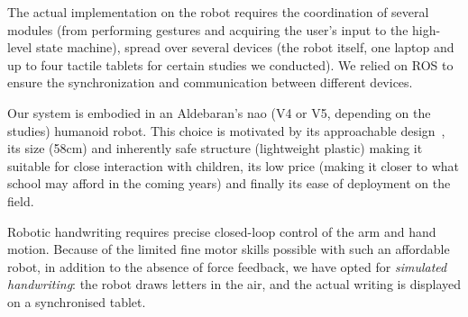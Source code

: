 \documentclass{sig-alternate}
\begin{document}
The actual implementation on the robot requires the coordination of
several modules (from performing gestures and acquiring the user's input to
the high-level state machine), spread over several devices (the robot itself,
one laptop and up to four tactile tablets for certain studies we conducted). We
relied on ROS to ensure the synchronization and communication between different devices.

Our system is embodied in an Aldebaran's {\sc nao} (V4 or V5, depending on the
studies) humanoid robot. This choice is motivated by its approachable
design~\cite{Gouaillier2008}, its size (58cm) and inherently safe structure
(lightweight plastic) making it suitable for close interaction with children,
its low price (making it closer to what school may afford in the coming years)
and finally its ease of deployment on the field.

Robotic handwriting requires precise closed-loop control of the arm and hand
motion. Because of the limited fine motor skills possible with such an
affordable robot, in addition to the absence of force feedback, we have opted
for \emph{simulated handwriting}: the robot draws letters in the air, and the
actual writing is displayed on a synchronised tablet.
\end{document}
